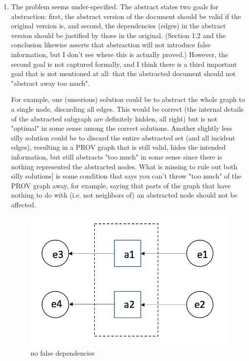 \documentclass{article}
\begin{document}
\begin{enumerate}
\item The problem seems under-specified.  The abstract states two goals for abstraction: first, the abstract version of the document should be valid if the original version is, and second, the dependencies (edges) in the abstract version should be justified by those in the original.  (Section 1.2 and the conclusion likewise asserts that abstraction will not introduce false information, but I don't see where this is actually proved.) However, the second goal is not captured formally, and I think there is a third important goal that is not mentioned at all: that the abstracted document should not "abstract away too much".

  
For example, one (unserious) solution could be to abstract the whole graph to a single node, discarding all edges.  This would be correct (the internal details of the abstracted subgraph are definitely hidden, all right) but is not "optimal" in some sense among the correct solutions.  Another slightly less silly solution could be to discard the entire abstracted set (and all incident edges), resulting in a PROV graph that is still valid, hides the intended information, but still abstracts "too much" in some sense since there is nothing represented the abstracted nodes.  What is missing to rule out both silly solutions] is some condition that says you can't throw "too much" of the PROV graph away, for example, saying that parts of the graph that have nothing to do with (i.e. not neighbors of) an abstracted node should not be affected.  



\begin{figure}
  \centering
  \includegraphics[scale=0.3]{example1.png}
  \caption{  \label{fig:example1} no false dependencies}
\end{figure}



\end{enumerate}
\end{document}
